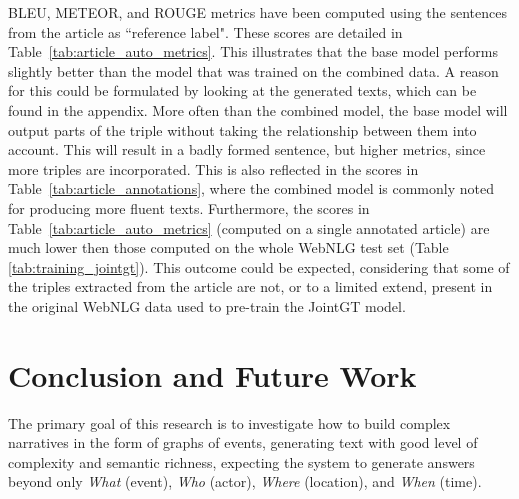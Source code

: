 \documentclass[
]{ceurart}
\begin{document}
BLEU, METEOR, and ROUGE metrics have been computed using the sentences from the article as ``reference label". These scores are detailed in Table~\ref{tab:article_auto_metrics}. This illustrates that the base model performs slightly better than the model that was trained on the combined data. A reason for this could be formulated by looking at the generated texts, which can be found in the appendix. More often than the combined model, the base model will output parts of the triple without taking the relationship between them into account. This will result in a badly formed sentence, but higher metrics, since more triples are incorporated. This is also reflected in the scores in Table~\ref{tab:article_annotations}, where the combined model is commonly noted for producing more fluent texts.
Furthermore, the scores in Table~\ref{tab:article_auto_metrics} (computed on a single annotated article) are much lower then those computed on the whole WebNLG test set (Table \ref{tab:training_jointgt}). This outcome could be expected, considering that some of the triples extracted from the article are not, or to a limited extend, present in the original WebNLG data used to pre-train the JointGT model.


\section{Conclusion and Future Work}
\label{sec:conclusion}
The primary goal of this research is to investigate how to build complex narratives in the form of graphs of events, generating text with good level of complexity and semantic richness, expecting the system to generate answers beyond only
\textit{What} (event), \textit{Who} (actor), \textit{Where} (location), and \textit{When} (time).
\end{document}
